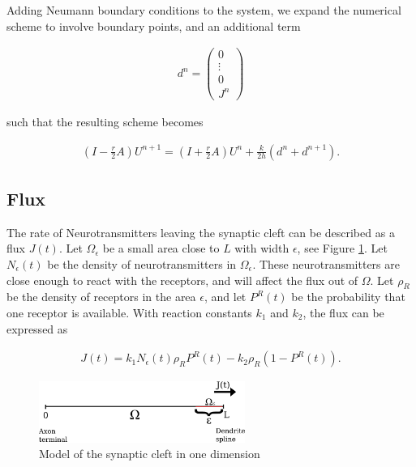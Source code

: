 \documentclass{article}
\begin{document}
Adding Neumann boundary conditions to the system, we expand the numerical scheme to involve boundary points, and an additional term

\begin{align*}
d^n = 
\begin{pmatrix}
0 \\
\vdots \\
0 \\
J^n
\end{pmatrix}
\end{align*}

such that the resulting scheme becomes

\begin{align*}
\left(I - \frac{r}{2} A\right)U^{n+1} = \left(I + \frac{r}{2} A\right) U^n + \frac{k}{2h}(d^n + d^{n+1}).
\end{align*}


\subsection*{Flux}

The rate of Neurotransmitters leaving the synaptic cleft can be described as a flux $J(t)$. Let $\Omega_{\epsilon}$ be a small area close to $L$ with width $\epsilon$, see Figure \ref{fig:model_1d}. Let $N_{\epsilon}(t)$ be the density of neurotransmitters in $\Omega_{\epsilon}$. These neurotransmitters are close enough to react with the receptors, and will affect the flux out of $\Omega$. Let $\rho_R$ be the density of receptors in the area $\epsilon$, and let $P^R(t)$ be the probability that one receptor is available. With reaction constants $k_1$ and $k_2$, the flux can be expressed as

\begin{align*}
J(t) = k_1 N_{\epsilon}(t) \rho_R P^R(t) - k_2 \rho_R (1-P^R(t)).
\end{align*}


\begin{figure}[ht]
        \centering
        \includegraphics[clip=true,width=0.6\textwidth]{model_1d}
        \caption{Model of the synaptic cleft in one dimension}
        \label{fig:model_1d}
\end{figure}
\end{document}
